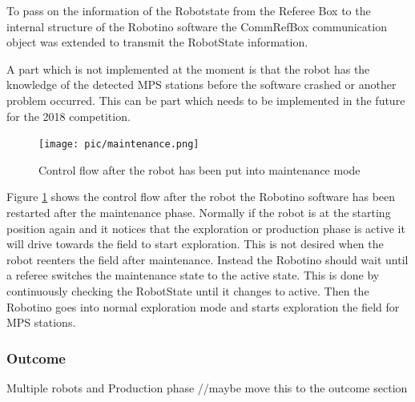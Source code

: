 To pass on the information of the Robotstate from the Referee Box to the internal structure of the Robotino software the CommRefBox communication object was extended to transmit the RobotState information. \\


\newpage

A part which is not implemented at the moment is that the robot has the knowledge of the detected MPS stations before the software crashed or another problem occurred. This can be part which needs to be implemented in the future for the 2018 competition. \\


\begin{figure}[h]
\centering
\texttt{[image: pic/maintenance.png]}
\caption{Control flow after the robot has been put into maintenance mode}
\label{fig:maintenance}
\end{figure}


Figure \ref{fig:maintenance} shows the control flow after the robot the Robotino software has been restarted after the maintenance phase. Normally if the robot is at the starting position again and it notices that the exploration or production phase is active it will drive towards the field to start exploration. This is not desired when the robot reenters the field after maintenance. Instead the Robotino should wait until a referee switches the maintenance state to the active state. This is done by continuously checking the RobotState until it changes to active. Then the Robotino goes into normal exploration mode and starts exploration the field for MPS stations. \\





\subsubsection{Outcome}

Multiple robots and Production phase
//maybe move this to the outcome section 






